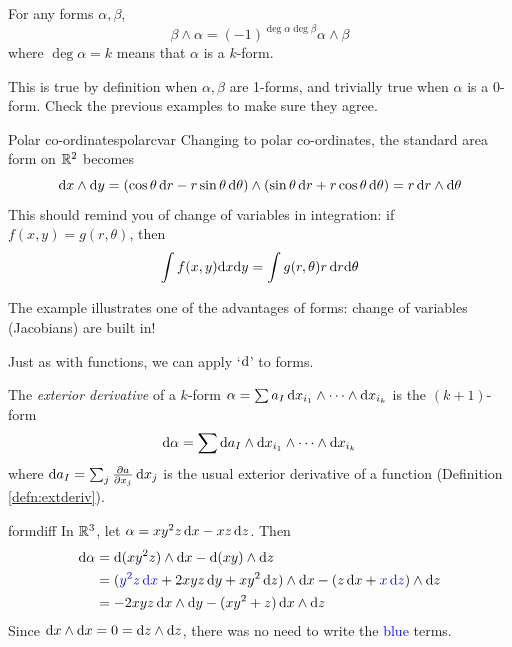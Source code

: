 \begin{lemm}{}{}
	For any forms $\alpha,\beta$,
	\[
		\beta\wedge\alpha=(-1)^{\deg\alpha\deg\beta}\alpha\wedge\beta
	\]
	where $\deg\alpha=k$ means that $\alpha$ is a $k$-form.
\end{lemm}


This is true by definition when $\alpha,\beta$ are 1-forms, and trivially true when $\alpha$ is a 0-form. Check the previous examples to make sure they agree.


\begin{example}{Polar co-ordinates}{polarcvar}
	Changing to polar co-ordinates, the standard area form on $\R^2$ becomes
	\[
		\dx\wedge\dy =(\cos\theta\,\dr-r\sin\theta\,\dth)\wedge (\sin\theta\,\dr+r\cos\theta\,\dth)=r\,\dr\wedge\dth
	\]
	This should remind you of change of variables in integration: if $f(x,y)=g(r,\theta)$, then
	\[
		\int f(x,y)\dx\dy=\int g(r,\theta)r\,\dr\dth
	\]
\end{example}

The example illustrates one of the advantages of forms: change of variables (Jacobians) are built in! %



Just as with functions, we can apply `$\D$' to forms.

\begin{defn}{}{}
	The \emph{exterior derivative} of a $k$-form $\alpha=\sum a_I\,\dx_{i_1}\wedge\cdots\wedge\dx_{i_k}$ is the $(k+1)$-form
	\[
		\D\alpha=\sum \D a_I\wedge\dx_{i_1}\wedge\cdots\wedge\dx_{i_k}
	\]
	where $\D a_I=\sum_j \partials[a]{x_j}\,\dx_j$ is the usual exterior derivative of a function (Definition \ref{defn:extderiv}).
\end{defn}

\begin{example}{}{formdiff}
	In $\R^3$, let $\alpha=xy^2z\,\dx-xz\,\dz$. Then
	\begin{align*}
		\D\alpha&=\D(xy^2z)\wedge\dx-\D(xy)\wedge\dz\\
		&=(\textcolor{blue}{y^2z\,\dx}+2xyz\,\dy+xy^2\,\dz)\wedge\dx -(z\,\dx+\textcolor{blue}{x\,\dz})\wedge\dz\\
		&=-2xyz\,\dx\wedge\dy -(xy^2+z)\,\dx\wedge\dz
	\end{align*}
	Since $\dx\wedge\dx=0=\dz\wedge\dz$, there was no need to write the \textcolor{blue}{blue} terms.
\end{example}


